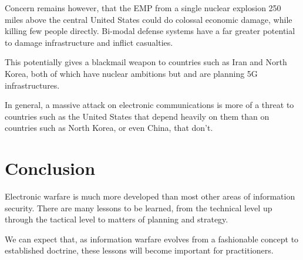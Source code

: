 \documentclass[10pt,journal,compsoc]{IEEEtran}
\begin{document}
Concern remains however, that the EMP from a single nuclear explosion 250 miles
above the central United States could do colossal economic damage, while killing few
people directly.
Bi-modal defense systems have a far greater potential to damage infrastructure and inflict casualties.

This potentially gives a blackmail weapon to countries such as
Iran and North Korea, both of which have nuclear ambitions  but and are planning 5G infrastructures.

In general, a massive attack on electronic communications is more of a threat to
countries such as the United States that depend heavily on them than on countries such
as North Korea, or even China, that don’t.

\section{Conclusion}

Electronic warfare is much more developed than most other areas of information security.
There are many lessons to be learned, from the technical level up through the tactical
level to matters of planning and strategy.

We can expect that, as information
warfare evolves from a fashionable concept to established doctrine, these lessons will
become important for practitioners.


%
\end{document}
